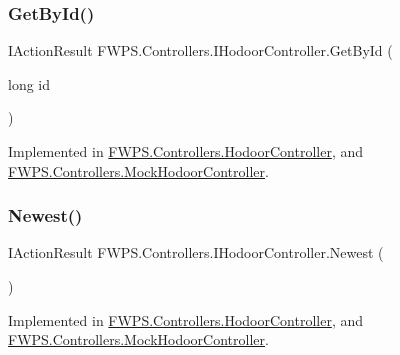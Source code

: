 \subsubsection{\texorpdfstring{Get\+By\+Id()}{GetById()}}
{\footnotesize\ttfamily I\+Action\+Result F\+W\+P\+S.\+Controllers.\+I\+Hodoor\+Controller.\+Get\+By\+Id (\begin{DoxyParamCaption}\item[{long}]{id }\end{DoxyParamCaption})}



Implemented in \mbox{\hyperlink{class_f_w_p_s_1_1_controllers_1_1_hodoor_controller_a27509de7aa39ce596b256d0cc4cc20f1}{F\+W\+P\+S.\+Controllers.\+Hodoor\+Controller}}, and \mbox{\hyperlink{class_f_w_p_s_1_1_controllers_1_1_mock_hodoor_controller_add58a70760f00b53f829d93057e7cff0}{F\+W\+P\+S.\+Controllers.\+Mock\+Hodoor\+Controller}}.

\mbox{\label{interface_f_w_p_s_1_1_controllers_1_1_i_hodoor_controller_a39f296accada798a0f161ba8e0ad8777}} 
\subsubsection{\texorpdfstring{Newest()}{Newest()}}
{\footnotesize\ttfamily I\+Action\+Result F\+W\+P\+S.\+Controllers.\+I\+Hodoor\+Controller.\+Newest (\begin{DoxyParamCaption}{ }\end{DoxyParamCaption})}



Implemented in \mbox{\hyperlink{class_f_w_p_s_1_1_controllers_1_1_hodoor_controller_a35f759a06b813cb402420ab98e64000c}{F\+W\+P\+S.\+Controllers.\+Hodoor\+Controller}}, and \mbox{\hyperlink{class_f_w_p_s_1_1_controllers_1_1_mock_hodoor_controller_ae87240e17b820c203ca8563ca46a598f}{F\+W\+P\+S.\+Controllers.\+Mock\+Hodoor\+Controller}}.

\mbox{\label{interface_f_w_p_s_1_1_controllers_1_1_i_hodoor_controller_a106763414af6e583aa8e73c23daeab2e}} 
